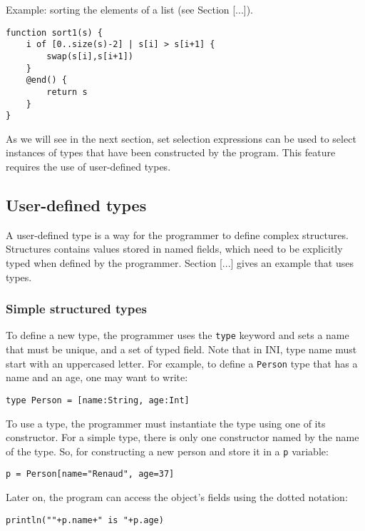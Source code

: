 \documentclass[11pt]{article}
\begin{document}
Example: sorting the elements of a list (see Section [...]).

\begin{lstlisting}
function sort1(s) {
	i of [0..size(s)-2] | s[i] > s[i+1] {
		swap(s[i],s[i+1])
	}
	@end() {
		return s
	}
}
\end{lstlisting}

As we will see in the next section, set selection expressions can be used to select instances of types that have been constructed by the program. This feature requires the use of user-defined types.

\subsection{User-defined types}

A user-defined type is a way for the programmer to define complex structures. Structures contains values stored in named fields, which need to be explicitly typed when defined by the programmer. Section [...] gives an example that uses types.

\subsubsection{Simple structured types}

To define a new type, the programmer uses the \texttt{type} keyword and sets a name that must be unique, and a set of typed field. Note that in INI, type name must start with an uppercased letter. For example, to define a \texttt{Person} type that has a name and an age, one may want to write:

\begin{lstlisting}[numbers=none]
type Person = [name:String, age:Int]
\end{lstlisting}

To use a type, the programmer must instantiate the type using one of its constructor. For a simple type, there is only one constructor named by the name of the type. So, for constructing a new person and store it in a \texttt{p} variable:

\begin{lstlisting}[numbers=none]
p = Person[name="Renaud", age=37]
\end{lstlisting}

Later on, the program can access the object's fields using the dotted notation:

\begin{lstlisting}[numbers=none]
println(""+p.name+" is "+p.age)
\end{lstlisting}
\end{document}

